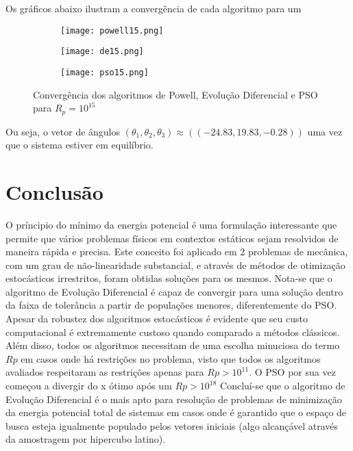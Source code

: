 \documentclass{article}
\begin{document}
Os gráficos abaixo ilustram a convergência de cada algoritmo para um 

\begin{figure}[H]
\centering
\begin{subfigure}{0.5\textwidth}
  \centering
  \texttt{[image: powell15.png]}
\end{subfigure}%
\begin{subfigure}{0.5\textwidth}
  \centering
  \texttt{[image: de15.png]}
\end{subfigure}
\begin{subfigure}{0.5\textwidth}
  \centering
  \texttt{[image: pso15.png]}
\end{subfigure}
\caption{Convergência dos algoritmos de Powell, Evolução Diferencial e PSO para $R_p = 10^{15}$}
\label{fig:p2}
\end{figure}

Ou seja, o vetor de ângulos $(\theta_1, \theta_2, \theta_3) \approx ((-24.83, 19.83, -0.28))$ uma vez que o sistema estiver em equilíbrio.
\section{Conclusão}
O príncipio do mínimo da energia potencial é uma formulação interessante que permite que vários problemas físicos em contextos estáticos sejam resolvidos de maneira rápida e precisa. Este conceito foi aplicado em 2 problemas de mecânica, com um grau de não-linearidade substancial, e através de métodos de otimização estocásticos irrestritos, foram obtidas soluções para os mesmos. Nota-se que o algoritmo de Evolução Diferencial é capaz de convergir para uma solução dentro da faixa de tolerância a partir de populações menores, diferentemente do PSO. Apesar da robustez dos algoritmos estocásticos é evidente que seu custo computacional é extremamente custoso quando comparado a métodos clássicos. Além disso, todos os algoritmos necessitam de uma escolha minuciosa do termo $Rp$ em casos onde há restrições no problema, visto que todos os algoritmos avaliados respeitaram as restrições apenas para $Rp > 10^{11}$. O PSO por sua vez começou a divergir do x ótimo após um $Rp > 10^{18}$\newline
Concluí-se que o algoritmo de Evolução Diferencial é o mais apto para resolução de problemas de minimização da energia potencial total de sistemas em casos onde é garantido que o espaço de busca esteja igualmente populado pelos vetores iniciais (algo alcançável através da amostragem por hipercubo latino).


\end{document}
